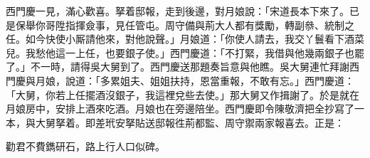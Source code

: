 西門慶一見，滿心歡喜。拏着邸報，走到後邊，對月娘說：「宋道長本下來了。已是保舉你哥陞指揮僉事，見任管屯。周守備與荊大人都有獎勵，轉副叅、統制之任。如今快使小厮請他來，對他說聲。」月娘道：「你使人請去，我交丫鬟看下酒菜兒。我愁他這一上任，也要銀子使。」西門慶道：「不打緊，我借與他幾兩銀子也罷了。」不一時，請得吳大舅到了。西門慶送那題奏旨意與他瞧。吳大舅連忙拜謝西門慶與月娘，說道：「多累姐夫、姐姐扶持，恩當重報，不敢有忘。」西門慶道：「大舅，你若上任擺酒沒銀子，我這裡兌些去使。」那大舅又作揖謝了。於是就在月娘房中，安排上酒來吃酒。月娘也在旁邊陪坐。西門慶即令陳敬濟把全抄寫了一本，與大舅拏着。即差玳安拏貼送邸報徃荊都監、周守禦兩家報喜去。正是：

\begin{myquote}
勸君不費鐫研石，路上行人口似碑。
\end{myquote}

